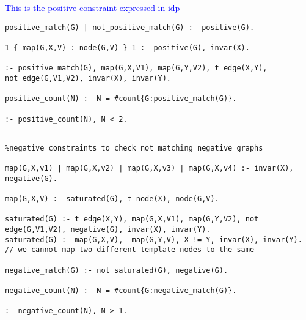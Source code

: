\documentclass{article}
\theoremstyle{definition}
\newcommand{\matthias}[1]{\textcolor{blue}{\marginpar{\sc Matthias} #1}}
\begin{document}
\matthias{This is the positive constraint expressed in idp}

\lstset{basicstyle=\footnotesize\ttfamily,breaklines=true}
\begin{lstlisting}[caption=ASP positive matching, style=model]
positive_match(G) | not_positive_match(G) :- positive(G).

1 { map(G,X,V) : node(G,V) } 1 :- positive(G), invar(X).

:- positive_match(G), map(G,X,V1), map(G,Y,V2), t_edge(X,Y), 
not edge(G,V1,V2), invar(X), invar(Y).

positive_count(N) :- N = #count{G:positive_match(G)}.

:- positive_count(N), N < 2.
\end{lstlisting}

\begin{lstlisting}[caption=ASP negative matching, style=model]
%Saturated Representation

%negative constraints to check not matching negative graphs

map(G,X,v1) | map(G,X,v2) | map(G,X,v3) | map(G,X,v4) :- invar(X), negative(G).

map(G,X,V) :- saturated(G), t_node(X), node(G,V).

saturated(G) :- t_edge(X,Y), map(G,X,V1), map(G,Y,V2), not edge(G,V1,V2), negative(G), invar(X), invar(Y).
saturated(G) :- map(G,X,V),  map(G,Y,V), X != Y, invar(X), invar(Y). // we cannot map two different template nodes to the same 

negative_match(G) :- not saturated(G), negative(G).

negative_count(N) :- N = #count{G:negative_match(G)}.

:- negative_count(N), N > 1.

\end{lstlisting}
\end{document}
